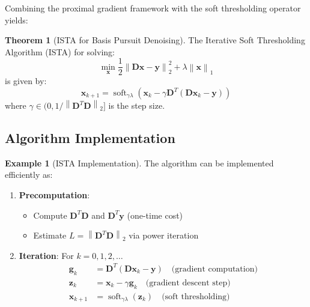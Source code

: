 \documentclass[12pt]{article}
\renewcommand{\vec}[1]{\mathbf{#1}}
\DeclareMathOperator{\soft}{soft}
\newcommand{\norm}[1]{\left\lVert#1\right\rVert}
\theoremstyle{definition}
\newtheorem{theorem}{Theorem}[section]
\newtheorem{example}{Example}[section]
\begin{document}
Combining the proximal gradient framework with the soft thresholding operator yields:

\begin{theorem}[ISTA for Basis Pursuit Denoising]
    The Iterative Soft Thresholding Algorithm (ISTA) for solving:
    \begin{equation}
        \min_{\vec{x}} \frac{1}{2}\norm{\vec{D}\vec{x} - \vec{y}}_2^2 + \lambda\norm{\vec{x}}_1
    \end{equation}
    is given by:
    \begin{equation}
        \boxed{\vec{x}_{k+1} = \soft_{\gamma\lambda}(\vec{x}_k - \gamma\vec{D}^T(\vec{D}\vec{x}_k - \vec{y}))}
        \label{eq:ista}
    \end{equation}
    where $\gamma \in (0, 1/\norm{\vec{D}^T\vec{D}}_2]$ is the step size.
\end{theorem}

\subsection{Algorithm Implementation}

\begin{example}[ISTA Implementation]
    The algorithm can be implemented efficiently as:
    \begin{enumerate}
        \item \textbf{Precomputation}:
              \begin{itemize}
                  \item Compute $\vec{D}^T\vec{D}$ and $\vec{D}^T\vec{y}$ (one-time cost)
                  \item Estimate $L = \norm{\vec{D}^T\vec{D}}_2$ via power iteration
              \end{itemize}

        \item \textbf{Iteration}: For $k = 0, 1, 2, \ldots$
              \begin{align}
                  \vec{g}_k     & = \vec{D}^T(\vec{D}\vec{x}_k - \vec{y}) \quad \text{(gradient computation)} \\
                  \vec{z}_k     & = \vec{x}_k - \gamma\vec{g}_k \quad \text{(gradient descent step)}          \\
                  \vec{x}_{k+1} & = \soft_{\gamma\lambda}(\vec{z}_k) \quad \text{(soft thresholding)}
              \end{align}
    \end{enumerate}
\end{example}
\end{document}
